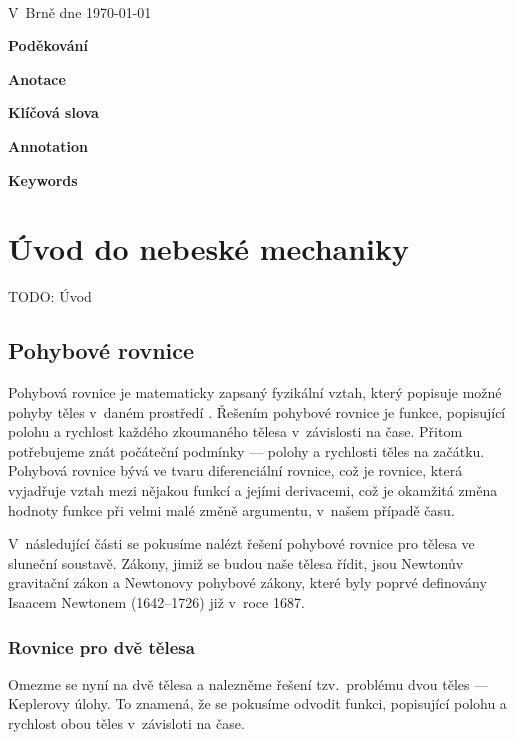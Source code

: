 \documentclass[A4paper, 12pt, oneside]{book}%
\begin{document}
\

V~Brně dne \today\ \dotfill \hspace{10mm}

\newpage

{\large \bfseries Poděkování}

\newpage

{\large \bfseries Anotace}

{\large \bfseries Klíčová slova}

{\large \bfseries Annotation}

{\large \bfseries Keywords}

\newpage

\tableofcontents

\newpage

\chapter{Úvod do nebeské mechaniky}
TODO: Úvod
\vspace{40mm}
\section{Pohybové rovnice}
Pohybová rovnice je matematicky zapsaný fyzikální vztah, který popisuje možné pohyby těles v~daném prostředí \cite{wiki:eqm}. Řešením pohybové rovnice je funkce, popisující polohu a rychlost každého zkoumaného tělesa v~závislosti na čase. Přitom potřebujeme znát počáteční podmínky --- polohy a rychlosti těles na začátku. Pohybová rovnice bývá ve tvaru diferenciální rovnice, což je rovnice, která vyjadřuje vztah mezi nějakou funkcí a jejími derivacemi, což je okamžitá změna hodnoty funkce při velmi malé změně argumentu, v~našem případě času. 

V~následující části se pokusíme nalézt řešení pohybové rovnice pro tělesa ve sluneční soustavě. Zákony, jimiž se budou naše tělesa řídit, jsou Newtonův gravitační zákon a Newtonovy pohybové zákony, které byly poprvé definovány Isaacem Newtonem (1642--1726) již v~roce 1687.
\subsection{Rovnice pro dvě tělesa} \label{sec:2body}
Omezme se nyní na dvě tělesa a nalezněme řešení tzv.\ problému dvou těles --- Keplerovy úlohy. To znamená, že se pokusíme odvodit funkci, popisující polohu a rychlost obou těles v~závisloti na čase. 
\end{document}

